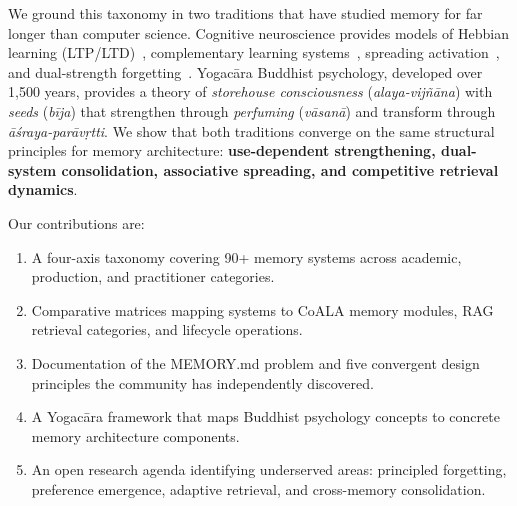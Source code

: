 We ground this taxonomy in two traditions that have studied memory for
far longer than computer science. Cognitive neuroscience provides
models of Hebbian learning (LTP/LTD)~\cite{hebb1949, bliss1973},
complementary learning systems~\cite{mcclelland1995}, spreading
activation~\cite{collins1975}, and dual-strength
forgetting~\cite{bjork1992}. Yogac\=ara Buddhist psychology, developed
over 1,500 years, provides a theory of \emph{storehouse consciousness}
(\emph{alaya-vij\~n\=ana}) with \emph{seeds} (\emph{b\=ija}) that
strengthen through \emph{perfuming} (\emph{v\=asan\=a}) and transform
through \emph{\=a\'sraya-par\=av\d{r}tti}. We show that both
traditions converge on the same structural principles for memory
architecture: \textbf{use-dependent strengthening, dual-system
consolidation, associative spreading, and competitive retrieval
dynamics}.

Our contributions are:
\begin{enumerate}[leftmargin=*, nosep]
    \item A four-axis taxonomy covering 90+ memory systems across
    academic, production, and practitioner categories.
    \item Comparative matrices mapping systems to CoALA memory
    modules, RAG retrieval categories, and lifecycle operations.
    \item Documentation of the MEMORY.md problem and five convergent
    design principles the community has independently discovered.
    \item A Yogac\=ara framework that maps Buddhist psychology concepts
    to concrete memory architecture components.
    \item An open research agenda identifying underserved areas:
    principled forgetting, preference emergence, adaptive retrieval,
    and cross-memory consolidation.
\end{enumerate}

